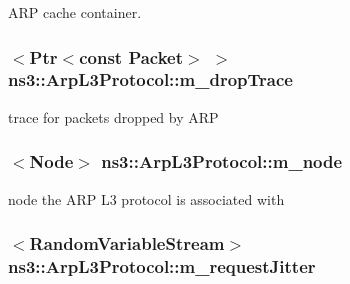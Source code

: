 A\+RP cache container. 

\subsubsection[{\texorpdfstring{m\+\_\+drop\+Trace}{m_dropTrace}}]{$<${\bf Ptr}$<$const {\bf Packet}$>$ $>$ ns3\+::\+Arp\+L3\+Protocol\+::m\+\_\+drop\+Trace\hspace{0.3cm}{\ttfamily [private]}}\hypertarget{classns3_1_1ArpL3Protocol_ac719ebd2b108a4d342741706669d74ad}{}\label{classns3_1_1ArpL3Protocol_ac719ebd2b108a4d342741706669d74ad}


trace for packets dropped by A\+RP 

\subsubsection[{\texorpdfstring{m\+\_\+node}{m_node}}]{$<${\bf Node}$>$ ns3\+::\+Arp\+L3\+Protocol\+::m\+\_\+node\hspace{0.3cm}{\ttfamily [private]}}\hypertarget{classns3_1_1ArpL3Protocol_aa1a2d173cfb3fd7e2f8eff8504a114da}{}\label{classns3_1_1ArpL3Protocol_aa1a2d173cfb3fd7e2f8eff8504a114da}


node the A\+RP L3 protocol is associated with 

\subsubsection[{\texorpdfstring{m\+\_\+request\+Jitter}{m_requestJitter}}]{$<${\bf Random\+Variable\+Stream}$>$ ns3\+::\+Arp\+L3\+Protocol\+::m\+\_\+request\+Jitter\hspace{0.3cm}{\ttfamily [private]}}\hypertarget{classns3_1_1ArpL3Protocol_a0d5144a236473eb6d7153600fdd7c5ee}{}\label{classns3_1_1ArpL3Protocol_a0d5144a236473eb6d7153600fdd7c5ee}


